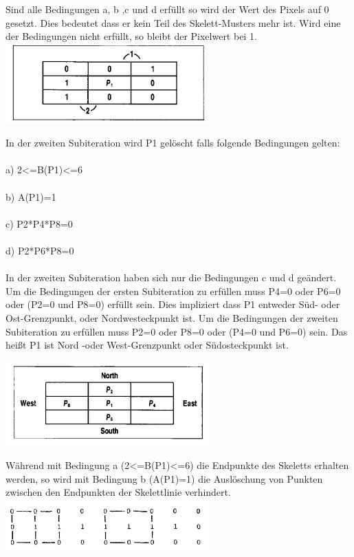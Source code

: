 Sind alle Bedingungen a, b ,c und d erfüllt so wird der Wert des Pixels auf 0 gesetzt.
Dies bedeutet dass er kein Teil des Skelett-Musters mehr ist.
Wird eine der Bedingungen nicht erfüllt, so bleibt der Pixelwert bei 1.\\

\includegraphics[width=8cm]{Res/01Folgen.png}


In der zweiten Subiteration wird P1 gelöscht falls folgende Bedingungen gelten: \\ \\
a) 2<=B(P1)<=6 \\ \\
b) A(P1)=1 \\ \\
c) P2*P4*P8=0 \\ \\
d) P2*P6*P8=0 \\ \\
In der zweiten Subiteration haben sich nur die Bedingungen c und d geändert.\\

Um die Bedingungen der ersten Subiteration zu erfüllen muss
P4=0 oder P6=0 oder (P2=0 und P8=0)  erfüllt sein.
Dies impliziert dass P1 entweder Süd- oder Ost-Grenzpunkt, oder Nordwesteckpunkt ist.
Um die Bedingungen der zweiten Subiteration zu erfüllen muss
P2=0 oder P8=0 oder (P4=0 und P6=0) sein.
Das heißt P1 ist Nord -oder West-Grenzpunkt oder Südosteckpunkt ist.

\includegraphics[width=8cm]{Res/Orientierung.png}


Während mit Bedingung a (2<=B(P1)<=6) die Endpunkte des Skeletts erhalten werden, so wird mit Bedingung b (A(P1)=1) die Auslöschung von Punkten zwischen den Endpunkten der Skelettlinie verhindert.\\

\includegraphics[width=8cm]{Res/EndpktVerbheit.png}


